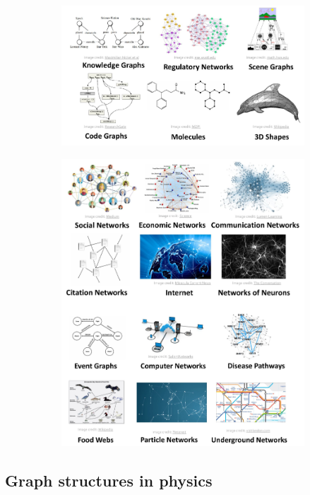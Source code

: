 \begin{figure}[ht]
	\centering
	\begin{subfigure}{.5\textwidth}
		\centering
		\includegraphics[width=0.9\linewidth]{figure_ml/datasets_ex1}
	\end{subfigure}%
	\begin{subfigure}{.5\textwidth}
		\centering
		\includegraphics[width=0.9\linewidth]{figure_ml/datasets_ex2}
	\end{subfigure}%
\end{figure}
\subsection{Graph structures in physics}

